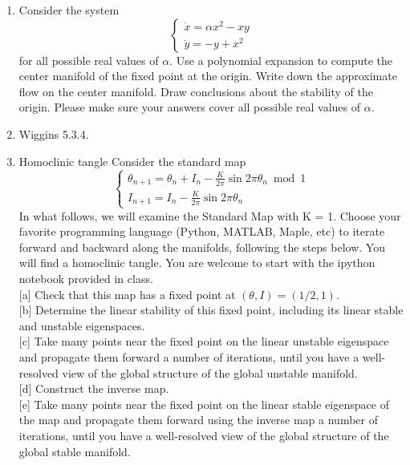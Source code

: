 \documentclass{article}
\begin{document}
\begin{enumerate}
\item Consider the system 
\begin{equation}
\left\{\begin{array}{l}
\dot x= \alpha x^2 -xy \\
\dot y = -y + x^2 
\end{array}\right.
\end{equation}
for all possible real values of  $\alpha$.  Use a polynomial expansion to compute the center manifold of the fixed point at the origin.  Write down the approximate flow on the center manifold.  Draw conclusions about the stability of the origin.  Please make sure your answers cover all possible real values of  $\alpha$.
\item
Wiggins 5.3.4.

\item{Homoclinic tangle} Consider the standard map
\begin{equation}
    \left\{\begin{array}{l}
\theta_{n+1}=\theta_{n}+I_{n}-\frac{K}{2 \pi} \sin 2 \pi \theta_{n} \bmod 1 \\
I_{n+1}=I_{n}-\frac{K}{2 \pi} \sin 2 \pi \theta_{n}
\end{array}\right.
\end{equation}
In what follows, we will examine the Standard Map with K = 1. Choose your
favorite programming language (Python, MATLAB, Maple, etc) to iterate forward
and backward along the manifolds, following the steps below. You will find a homoclinic tangle. You are welcome to start with the ipython notebook provided in class.\\

[a]  Check that this map has a fixed point at $(\theta, I) = (1/2, 1)$. \\

[b] Determine the linear stability of this fixed point, including its linear stable
and unstable eigenspaces.\\

[c] Take many points near the fixed point on the linear unstable eigenspace and
propagate them forward a number of iterations, until you have a well-resolved
view of the global structure of the global unstable manifold. \\

[d] Construct the inverse map.\\

[e] Take many points near the fixed point on the linear stable eigenspace of the
map and propagate them forward using the inverse map a number of iterations,
until you have a well-resolved view of the global structure of the global stable
manifold.\\ 


\end{enumerate}
\end{document}
